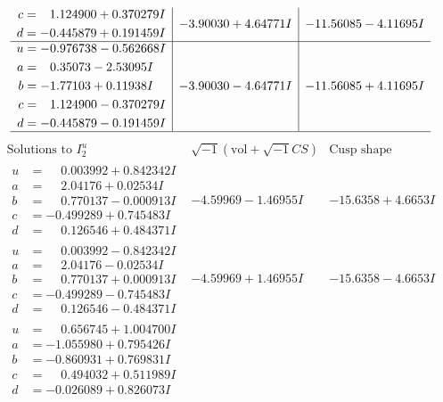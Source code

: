 \documentclass[1p]{elsarticle_modified}
\theoremstyle{definition}
\newcommand{\I}{\sqrt{-1}}
\begin{document}
$$\begin{array}{c|c|c}
\begin{aligned}
c &= \phantom{-}1.124900 + 0.370279 I \\
d &= -0.445879 + 0.191459 I\end{aligned}
 & -3.90030 + 4.64771 I & -11.56085 - 4.11695 I \\ \hline\begin{aligned}
u &= -0.976738 - 0.562668 I \\
a &= \phantom{-}0.35073 - 2.53095 I \\
b &= -1.77103 + 0.11938 I \\
c &= \phantom{-}1.124900 - 0.370279 I \\
d &= -0.445879 - 0.191459 I\end{aligned}
 & -3.90030 - 4.64771 I & -11.56085 + 4.11695 I\\
 \hline 
 \end{array}$$\newpage$$\begin{array}{c|c|c}  
\text{Solutions to }I^u_{2}& \I (\text{vol} + \sqrt{-1}CS) & \text{Cusp shape}\\
 \hline 
\begin{aligned}
u &= \phantom{-}0.003992 + 0.842342 I \\
a &= \phantom{-}2.04176 + 0.02534 I \\
b &= \phantom{-}0.770137 - 0.000913 I \\
c &= -0.499289 + 0.745483 I \\
d &= \phantom{-}0.126546 + 0.484371 I\end{aligned}
 & -4.59969 - 1.46955 I & -15.6358 + 4.6653 I \\ \hline\begin{aligned}
u &= \phantom{-}0.003992 - 0.842342 I \\
a &= \phantom{-}2.04176 - 0.02534 I \\
b &= \phantom{-}0.770137 + 0.000913 I \\
c &= -0.499289 - 0.745483 I \\
d &= \phantom{-}0.126546 - 0.484371 I\end{aligned}
 & -4.59969 + 1.46955 I & -15.6358 - 4.6653 I \\ \hline\begin{aligned}
u &= \phantom{-}0.656745 + 1.004700 I \\
a &= -1.055980 + 0.795426 I \\
b &= -0.860931 + 0.769831 I \\
c &= \phantom{-}0.494032 + 0.511989 I \\
d &= -0.026089 + 0.826073 I\end{aligned}

\end{array}$$
\end{document}
